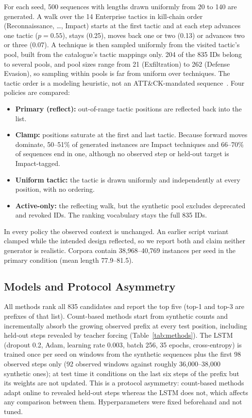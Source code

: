 \documentclass[conference]{IEEEtran}
\begin{document}
For each seed, 500 sequences with lengths drawn uniformly from 20 to 140 are generated. A walk over the 14 Enterprise tactics in kill-chain order (Reconnaissance, \ldots, Impact) starts at the first tactic and at each step advances one tactic ($p = 0.55$), stays (0.25), moves back one or two (0.13) or advances two or three (0.07). A technique is then sampled uniformly from the visited tactic's pool, built from the catalogue's tactic mappings only. 204 of the 835 IDs belong to several pools, and pool sizes range from 21 (Exfiltration) to 262 (Defense Evasion), so sampling within pools is far from uniform over techniques. The tactic order is a modeling heuristic, not an ATT\&CK-mandated sequence~\cite{mitre_tactics}. Four policies are compared:
\begin{itemize}
\item \textbf{Primary (reflect):} out-of-range tactic positions are reflected back into the list.
\item \textbf{Clamp:} positions saturate at the first and last tactic. Because forward moves dominate, 50--51\% of generated instances are Impact techniques and 66--70\% of sequences end in one, although no observed step or held-out target is Impact-tagged.
\item \textbf{Uniform tactic:} the tactic is drawn uniformly and independently at every position, with no ordering.
\item \textbf{Active-only:} the reflecting walk, but the synthetic pool excludes deprecated and revoked IDs. The ranking vocabulary stays the full 835 IDs.
\end{itemize}
In every policy the observed context is unchanged. An earlier script variant clamped while the intended design reflected, so we report both and claim neither generator is realistic. Corpora contain 38{,}968--40{,}769 instances per seed in the primary condition (mean length 77.9--81.5).

\subsection{Models and Protocol Asymmetry}

All methods rank all 835 candidates and report the top five (top-1 and top-3 are prefixes of that list). Count-based methods start from synthetic counts and incrementally absorb the growing observed prefix at every test position, including held-out steps revealed by teacher forcing (Table~\ref{tab:methods}). The LSTM (dropout 0.2, Adam, learning rate 0.003, batch 256, 35 epochs, cross-entropy) is trained once per seed on windows from the synthetic sequences plus the first 98 observed steps only (92 observed windows against roughly 36{,}000--38{,}000 synthetic ones); at test time it conditions on the last six steps of the prefix but its weights are not updated. This is a protocol asymmetry: count-based methods adapt online to revealed held-out steps whereas the LSTM does not, which affects any comparison between them. Hyperparameters were fixed beforehand and not tuned.
\end{document}
